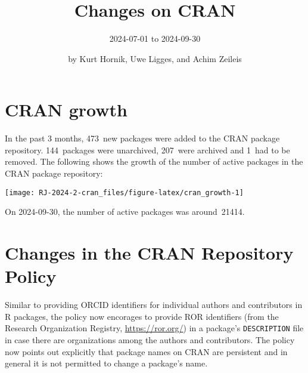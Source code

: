 \title{Changes on CRAN}
\subtitle{%
2024-07-01 to 2024-09-30
}
\author{by Kurt Hornik, Uwe Ligges, and Achim Zeileis}
\maketitle
\section{CRAN growth}\label{cran-growth}
In the past 3 months, 473~new packages were
added to the CRAN package repository. 144~packages
were unarchived, 207~were archived and
1~had to be removed. The following shows the
growth of the number of active packages in the CRAN package repository:
\begin{center}\texttt{[image: RJ-2024-2-cran\_files/figure-latex/cran\_growth-1]} \end{center}
\noindent On 2024-09-30, the number of active packages was around~21414.
\section{Changes in the CRAN Repository Policy}\label{changes-in-the-cran-repository-policy}
Similar to providing ORCID identifiers for individual authors and contributors in R packages,
the policy now encorages to provide ROR identifiers (from the Research Organization Registry,
\url{https://ror.org/}) in a package's \texttt{DESCRIPTION} file in case there are organizations among
the authors and contributors.
The policy now points out explicitly that package names on CRAN are persistent and in general
it is not permitted to change a package's name.
